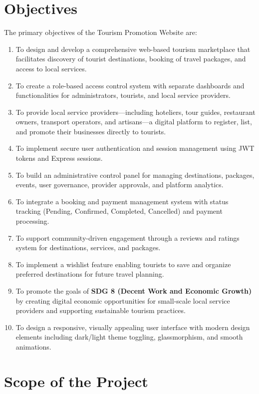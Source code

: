 \section{Objectives}

The primary objectives of the Tourism Promotion Website are:

\begin{enumerate}[leftmargin=2em]
    \item To design and develop a comprehensive web-based tourism marketplace that facilitates discovery of tourist destinations, booking of travel packages, and access to local services.
    \item To create a role-based access control system with separate dashboards and functionalities for administrators, tourists, and local service providers.
    \item To provide local service providers---including hoteliers, tour guides, restaurant owners, transport operators, and artisans---a digital platform to register, list, and promote their businesses directly to tourists.
    \item To implement secure user authentication and session management using JWT tokens and Express sessions.
    \item To build an administrative control panel for managing destinations, packages, events, user governance, provider approvals, and platform analytics.
    \item To integrate a booking and payment management system with status tracking (Pending, Confirmed, Completed, Cancelled) and payment processing.
    \item To support community-driven engagement through a reviews and ratings system for destinations, services, and packages.
    \item To implement a wishlist feature enabling tourists to save and organize preferred destinations for future travel planning.
    \item To promote the goals of \textbf{SDG 8 (Decent Work and Economic Growth)} by creating digital economic opportunities for small-scale local service providers and supporting sustainable tourism practices.
    \item To design a responsive, visually appealing user interface with modern design elements including dark/light theme toggling, glassmorphism, and smooth animations.
\end{enumerate}

\section{Scope of the Project}

